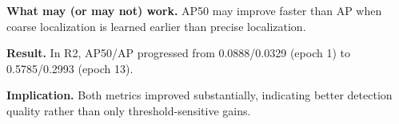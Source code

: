 \textbf{What may (or may not) work.}
AP50 may improve faster than AP when coarse localization is learned earlier than precise localization.

\textbf{Result.}
In R2, AP50/AP progressed from 0.0888/0.0329 (epoch 1) to 0.5785/0.2993 (epoch 13).

\textbf{Implication.}
Both metrics improved substantially, indicating better detection quality rather than only threshold-sensitive gains.
